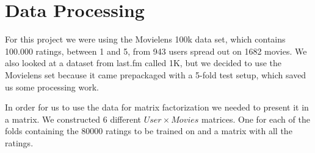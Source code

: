 \section{Data Processing}\label{sec:data_preprocessing}
For this project we were using the Movielens 100k data set, which contains 100.000 ratings, between 1 and 5, from 943 users spread out on 1682 movies\cite{movielens100k}. 
We also looked at a dataset from last.fm called 1K\cite{lastfmdataset}, but we decided to use the Movielens set because it came prepackaged with a 5-fold test setup, which saved us some processing work.

In order for us to use the data for matrix factorization we needed to present it in a matrix. We constructed 6 different $User \times Movies$ matrices. One for each of the folds containing the 80000 ratings to be trained on and a matrix with all the ratings.


